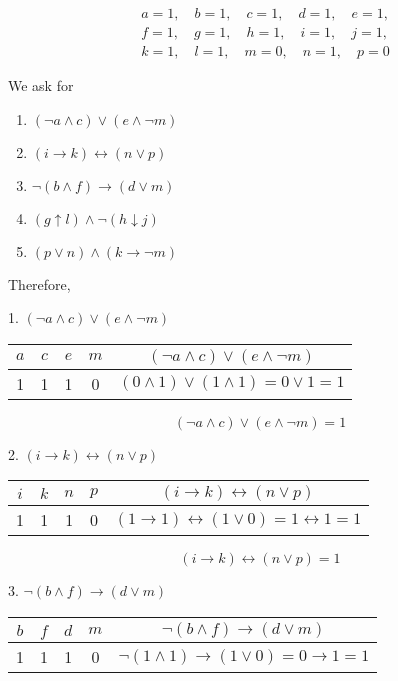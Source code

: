 \documentclass[12pt,a4paper,openany]{article}
\begin{document}
\[
\begin{aligned}
&a = 1, \quad b = 1, \quad c = 1, \quad d = 1, \quad e = 1, \\
&f = 1, \quad g = 1, \quad h = 1, \quad i = 1, \quad j = 1, \\
&k = 1, \quad l = 1, \quad m = 0, \quad n = 1, \quad p = 0
\end{aligned}
\]

We ask for
\begin{enumerate}
  \item \((\neg a \land c) \lor (e \land \neg m)\)
  \item \((i \to k) \leftrightarrow (n \lor p)\)
  \item \(\neg(b \land f) \to (d \lor m)\)
  \item \((g \uparrow l) \land \neg(h \downarrow j)\)
  \item \((p \lor n) \land (k \to \neg m)\)
\end{enumerate}

Therefore,

{1. } $(\neg a \land c) \lor (e \land \neg m)$

\begin{center}
\begin{tabular}{|c|c|c|c||c|}
\hline
$a$ & $c$ & $e$ & $m$ & $(\neg a \land c) \lor (e \land \neg m)$ \\
\hline
1 & 1 & 1 & 0 & $(0 \land 1) \lor (1 \land 1) = 0 \lor 1 = 1$ \\
\hline
\end{tabular}
\end{center}

\[
\boxed{(\neg a \land c) \lor (e \land \neg m) = 1}
\]

{2. } $(i \to k) \leftrightarrow (n \lor p)$

\begin{center}
\begin{tabular}{|c|c|c|c||c|}
\hline
$i$ & $k$ & $n$ & $p$ & $(i \to k) \leftrightarrow (n \lor p)$ \\
\hline
1 & 1 & 1 & 0 & $(1 \to 1) \leftrightarrow (1 \lor 0) = 1 \leftrightarrow 1 = 1$ \\
\hline
\end{tabular}
\end{center}

\[
\boxed{(i \to k) \leftrightarrow (n \lor p) = 1}
\]

{3. } $\neg(b \land f) \to (d \lor m)$

\begin{center}
\begin{tabular}{|c|c|c|c||c|}
\hline
$b$ & $f$ & $d$ & $m$ & $\neg(b \land f) \to (d \lor m)$ \\
\hline
1 & 1 & 1 & 0 & $\neg(1 \land 1) \to (1 \lor 0) = 0 \to 1 = 1$ \\
\hline
\end{tabular}
\end{center}
\end{document}
